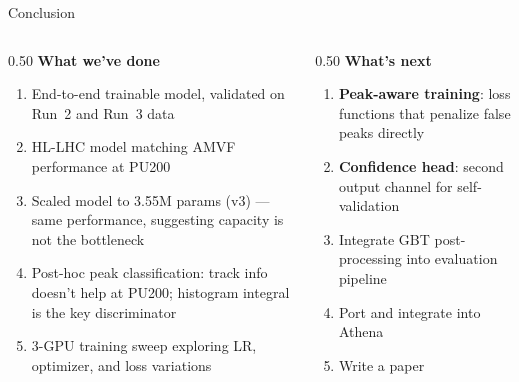 \documentclass[xcolor=table,aspectratio=169]{beamer}
\begin{document}
\begin{frame}{Conclusion}
    \begin{columns}[t]
        \begin{column}{0.50\linewidth}
            \textbf{What we've done}
            \begin{enumerate}
                \setlength\itemsep{0.45em}
                \item End-to-end trainable model, validated on Run~2 and Run~3 data
                \item HL-LHC model matching AMVF performance at PU200
                \item Scaled model to 3.55M params (v3) --- same performance, suggesting capacity is not the bottleneck
                \item Post-hoc peak classification: track info doesn't help at PU200; histogram integral is the key discriminator
                \item 3-GPU training sweep exploring LR, optimizer, and loss variations
            \end{enumerate}
        \end{column}
        \begin{column}{0.50\linewidth}
            \textbf{What's next}
            \begin{enumerate}
                \setlength\itemsep{0.45em}
                \item \textbf{Peak-aware training}: loss functions that penalize false peaks directly
                \item \textbf{Confidence head}: second output channel for self-validation
                \item Integrate GBT post-processing into evaluation pipeline
                \item Port and integrate into Athena
                \item Write a paper
            \end{enumerate}
        \end{column}
    \end{columns}
\end{frame}

\end{document}
